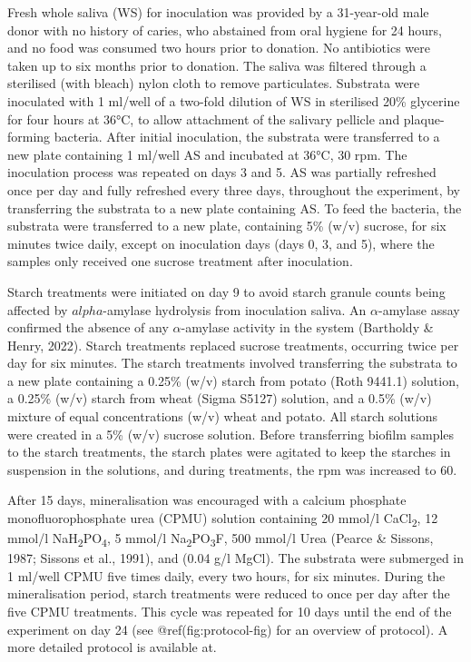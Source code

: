 \documentclass[
]{article}
\begin{document}
Fresh whole saliva (WS) for inoculation was provided by a 31-year-old
male donor with no history of caries, who abstained from oral hygiene
for 24 hours, and no food was consumed two hours prior to donation. No
antibiotics were taken up to six months prior to donation. The saliva
was filtered through a sterilised (with bleach) nylon cloth to remove
particulates. Substrata were inoculated with 1 ml/well of a two-fold
dilution of WS in sterilised 20\% glycerine for four hours at 36°C, to
allow attachment of the salivary pellicle and plaque-forming bacteria.
After initial inoculation, the substrata were transferred to a new plate
containing 1 ml/well AS and incubated at 36°C, 30 rpm. The inoculation
process was repeated on days 3 and 5. AS was partially refreshed once
per day and fully refreshed every three days, throughout the experiment,
by transferring the substrata to a new plate containing AS. To feed the
bacteria, the substrata were transferred to a new plate, containing 5\%
(w/v) sucrose, for six minutes twice daily, except on inoculation days
(days 0, 3, and 5), where the samples only received one sucrose
treatment after inoculation.

Starch treatments were initiated on day 9 to avoid starch granule counts
being affected by \(alpha\)-amylase hydrolysis from inoculation saliva.
An \(\alpha\)-amylase assay confirmed the absence of any
\(\alpha\)-amylase activity in the system (Bartholdy \& Henry, 2022).
Starch treatments replaced sucrose treatments, occurring twice per day
for six minutes. The starch treatments involved transferring the
substrata to a new plate containing a 0.25\% (w/v) starch from potato
(Roth 9441.1) solution, a 0.25\% (w/v) starch from wheat (Sigma S5127)
solution, and a 0.5\% (w/v) mixture of equal concentrations (w/v) wheat
and potato. All starch solutions were created in a 5\% (w/v) sucrose
solution. Before transferring biofilm samples to the starch treatments,
the starch plates were agitated to keep the starches in suspension in
the solutions, and during treatments, the rpm was increased to 60.

After 15 days, mineralisation was encouraged with a calcium phosphate
monofluorophosphate urea (CPMU) solution containing 20 mmol/l
CaCl\textsubscript{2}, 12 mmol/l
NaH\textsubscript{2}PO\textsubscript{4}, 5 mmol/l
Na\textsubscript{2}PO\textsubscript{3}F, 500 mmol/l Urea (Pearce \&
Sissons, 1987; Sissons et al., 1991), and (0.04 g/l MgCl). The substrata
were submerged in 1 ml/well CPMU five times daily, every two hours, for
six minutes. During the mineralisation period, starch treatments were
reduced to once per day after the five CPMU treatments. This cycle was
repeated for 10 days until the end of the experiment on day 24 (see
@ref(fig:protocol-fig) for an overview of protocol). A more detailed
protocol is available at.
\end{document}
